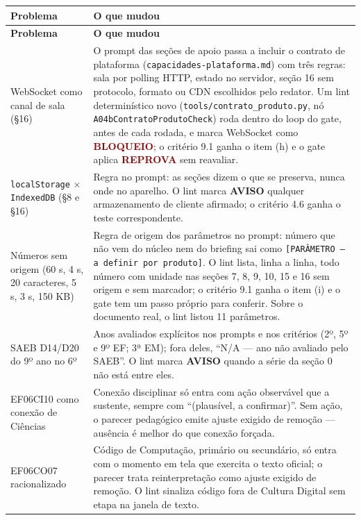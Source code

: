 \documentclass[11pt,a4paper]{article}
\newcommand{\arq}[1]{\texttt{\small #1}}
\begin{document}
\begin{small}
\begin{longtable}{@{}p{} p{}@{}}
\toprule
\textbf{Problema} & \textbf{O que mudou} \\
\midrule
\endfirsthead
\toprule
\textbf{Problema} & \textbf{O que mudou} \\
\midrule
\endhead
WebSocket como canal de sala (\S 16) & O prompt das seções de apoio passa a incluir o contrato de plataforma (\arq{capacidades-plataforma.md}) com três regras: sala por polling HTTP, estado no servidor, seção 16 sem protocolo, formato ou CDN escolhidos pelo redator. Um lint determinístico novo (\arq{tools/contrato\_produto.py}, nó \arq{A04bContratoProdutoCheck}) roda dentro do loop do gate, antes de cada rodada, e marca WebSocket como \textcolor{DarkRed}{\textbf{BLOQUEIO}}; o critério 9.1 ganha o item (h) e o gate aplica \textcolor{DarkRed}{\textbf{REPROVA}} sem reavaliar. \\
\arq{localStorage} \(\times\) \arq{IndexedDB} (\S 8 e \S 16) & Regra no prompt: as seções dizem o que se preserva, nunca onde no aparelho. O lint marca \textcolor{DarkYellow}{\textbf{AVISO}} qualquer armazenamento de cliente afirmado; o critério 4.6 ganha o teste correspondente. \\
Números sem origem (60 s, 4 s, 20 caracteres, 5 s, 3 s, 150 KB) & Regra de origem dos parâmetros no prompt: número que não vem do núcleo nem do briefing sai como \arq{[PARÂMETRO --- a definir por produto]}. O lint lista, linha a linha, todo número com unidade nas seções 7, 8, 9, 10, 15 e 16 sem origem e sem marcador; o critério 9.1 ganha o item (i) e o gate tem um passo próprio para conferir. Sobre o documento real, o lint listou 11 parâmetros. \\
SAEB D14/D20 do 9º ano no 6º & Anos avaliados explícitos nos prompts e nos critérios (2º, 5º e 9º EF; 3ª EM); fora deles, ``N/A --- ano não avaliado pelo SAEB''. O lint marca \textcolor{DarkYellow}{\textbf{AVISO}} quando a série da seção 0 não está entre eles. \\
EF06CI10 como conexão de Ciências & Conexão disciplinar só entra com ação observável que a sustente, sempre com ``(plausível, a confirmar)''. Sem ação, o parecer pedagógico emite ajuste exigido de remoção --- ausência é melhor do que conexão forçada. \\
EF06CO07 racionalizado & Código de Computação, primário ou secundário, só entra com o momento em tela que exercita o texto oficial; o parecer trata reinterpretação como ajuste exigido de remoção. O lint sinaliza código fora de Cultura Digital sem etapa na janela de texto. \\

\end{longtable}
\end{small}
\end{document}
